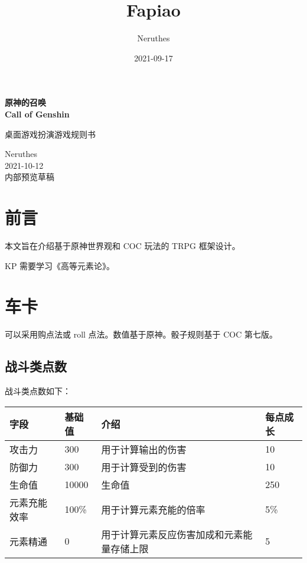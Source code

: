\documentclass[a4paper,12pt]{article}
\title{Fapiao}
\author{Neruthes}
\date{2021-09-17}
\begin{document}
    \pagestyle{empty}
    \sffamily



    \begin{titlepage}
        \hspace{1pt}
        \vspace{100pt}

        \center
        \bfseries
        \Huge
        原神的召唤\\
        \huge
        Call of Genshin

        \vspace{10pt}
        \large\mdseries
        桌面游戏扮演游戏规则书

        \vfill
        \normalsize\mdseries
        Neruthes\\
        2021-10-12\\
        内部预览草稿
        \vspace{100pt}
    \end{titlepage}

    \section{前言}

    本文旨在介绍基于原神世界观和 COC 玩法的 TRPG 框架设计。

    KP 需要学习《高等元素论》。

    \section{车卡}

    可以采用购点法或 roll 点法。数值基于原神。骰子规则基于 COC 第七版。

    \subsection{战斗类点数}

    战斗类点数如下：

    \begin{tabu} {|llXl|}
        \hline
        字段 & 基础值 & 介绍 & 每点成长 \\
        \hline
        攻击力 & 300 & 用于计算输出的伤害 & 10 \\
        防御力 & 300 & 用于计算受到的伤害 & 10 \\
        生命值 & 10000 & 生命值 & 250 \\
        元素充能效率 & 100\% & 用于计算元素充能的倍率 & 5\% \\
        元素精通 & 0 & 用于计算元素反应伤害加成和元素能量存储上限 & 5 \\
        \hline
    \end{tabu}
\end{document}
